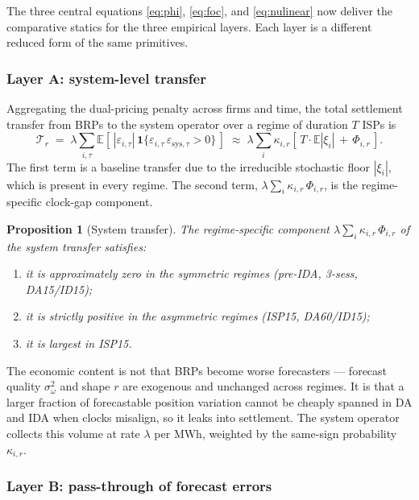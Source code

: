 \documentclass[11pt]{article}
\newtheorem{proposition}{Proposition}
\begin{document}
The three central equations \eqref{eq:phi}, \eqref{eq:foc}, and \eqref{eq:nulinear} now deliver the comparative statics for the three empirical layers. Each layer is a different reduced form of the same primitives.

\subsubsection*{Layer A: system-level transfer}

Aggregating the dual-pricing penalty across firms and time, the total settlement transfer from BRPs to the system operator over a regime of duration $T$ ISPs is
\begin{equation}
\mathcal{T}_{r} \;=\; \lambda \sum_{i,\tau}
\mathbb{E}\!\left[\,|\varepsilon_{i,\tau}|\,\mathbf{1}\{\varepsilon_{i,\tau}\,\varepsilon_{\text{sys},\tau} > 0\}\,\right]
\;\approx\; \lambda \sum_{i} \kappa_{i,r}\!\left[\,T \cdot \mathbb{E}|\xi_{i}| \,+\, \Phi_{i,r}\,\right].
\label{eq:transfer}
\end{equation}
The first term is a baseline transfer due to the irreducible stochastic floor $|\xi_{i}|$, which is present in every regime. The second term, $\lambda \sum_{i} \kappa_{i,r}\,\Phi_{i,r}$, is the regime-specific clock-gap component.

\begin{proposition}[System transfer]
\label{prop:transfer}
The regime-specific component $\lambda \sum_{i} \kappa_{i,r}\,\Phi_{i,r}$ of the system transfer satisfies:
\begin{enumerate}[label=(\roman*)]
\item it is approximately zero in the symmetric regimes (pre-IDA, 3-sess, DA15/ID15);
\item it is strictly positive in the asymmetric regimes (ISP15, DA60/ID15);
\item it is largest in ISP15.
\end{enumerate}
\end{proposition}

The economic content is not that BRPs become worse forecasters --- forecast quality $\sigma_{\omega}^{2}$ and shape $r$ are exogenous and unchanged across regimes. It is that a larger fraction of forecastable position variation cannot be cheaply spanned in DA and IDA when clocks misalign, so it leaks into settlement. The system operator collects this volume at rate $\lambda$ per MWh, weighted by the same-sign probability $\kappa_{i,r}$.

\subsubsection*{Layer B: pass-through of forecast errors}
\end{document}
